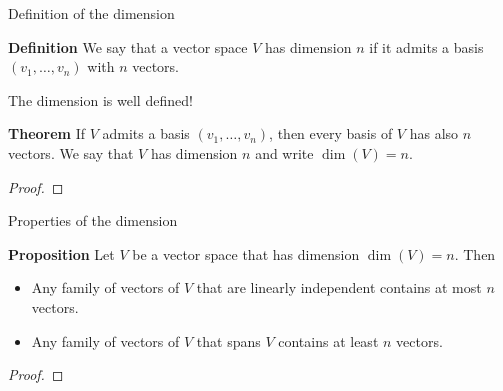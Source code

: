 \documentclass{beamer}
\begin{document}
\begin{frame}[t]{Definition of the dimension}
	\begin{block}{\bf Definition}
		We say that a vector space $V$ has dimension $n$ if it admits a basis $(v_1, \dots, v_n)$ with $n$ vectors.
	\end{block}
\end{frame}

\begin{frame}[t]{The dimension is well defined!}
	\begin{block}{\bf Theorem}
		If $V$ admits a basis $(v_1, \dots, v_n)$, then every basis of $V$ has also $n$ vectors. We say that $V$ has dimension $n$ and write $\dim(V) = n$.
	\end{block}
	\begin{proof}
		\vspace{3cm}
		\vfill
	\end{proof}
\end{frame}

\begin{frame}[t]{Properties of the dimension}
	\vspace{-0.4cm}
	\begin{block}{\bf Proposition}
		Let $V$ be a vector space that has dimension $\dim(V) = n$. Then
		\begin{itemize}
			\item Any family of vectors of $V$ that are linearly independent contains at most $n$ vectors.
			\item Any family of vectors of $V$ that spans $V$ contains at least $n$ vectors.
		\end{itemize}
	\end{block}
	\begin{proof}
		\vspace{2cm}
		\vfill
	\end{proof}
	\pause
\end{frame}
\end{document}
